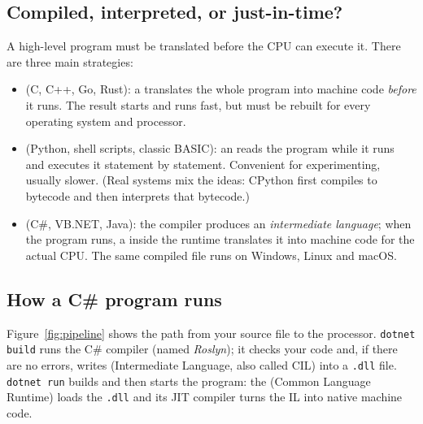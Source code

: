 \subsection{Compiled, interpreted, or just-in-time?}
A high-level program must be translated before the CPU can execute it. There are three main strategies:
\begin{itemize}[leftmargin=*,itemsep=2pt]
  \item {} (C, C++, Go, Rust): a  translates the whole program into machine code \emph{before} it runs. The result starts and runs fast, but must be rebuilt for every operating system and processor.
  \item {} (Python, shell scripts, classic BASIC): an  reads the program while it runs and executes it statement by statement. Convenient for experimenting, usually slower. (Real systems mix the ideas: CPython first compiles to bytecode and then interprets that bytecode.)
  \item {} (C\#, VB.NET, Java): the compiler produces an \emph{intermediate language}; when the program runs, a  inside the runtime translates it into machine code for the actual CPU. The same compiled file runs on Windows, Linux and macOS.
\end{itemize}

\subsection{How a C\# program runs}
Figure~\ref{fig:pipeline} shows the path from your source file to the processor. \texttt{dotnet build} runs the C\# compiler (named \emph{Roslyn}); it checks your code and, if there are no errors, writes  (Intermediate Language, also called CIL) into a \texttt{.dll} file. \texttt{dotnet run} builds and then starts the program: the  (Common Language Runtime) loads the \texttt{.dll} and its JIT compiler turns the IL into native machine code.


